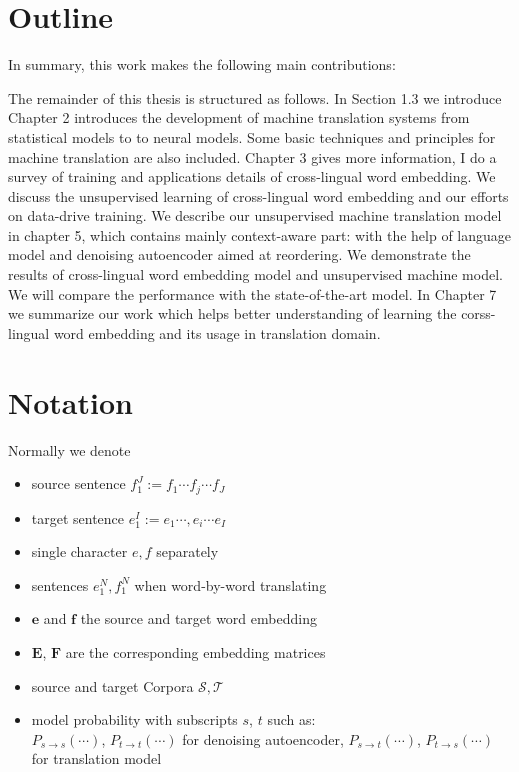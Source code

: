\section{Outline}
In summary, this work makes the following main contributions:

The remainder of this thesis is structured as follows. In Section 1.3 we introduce 
Chapter 2 introduces the development of machine translation systems from statistical models to to neural models. Some basic techniques and principles for machine translation are also included.  Chapter 3 gives more information,  I do a survey of training and applications details of cross-lingual word embedding. We discuss the unsupervised learning of cross-lingual word embedding and our efforts on data-drive training. We describe our unsupervised machine translation model in chapter 5, which contains mainly context-aware part: with the help of language model and denoising autoencoder aimed at reordering. We demonstrate the results of cross-lingual word embedding model and unsupervised machine model. We will compare the performance with the state-of-the-art model. In Chapter 7 we summarize our work which helps better understanding of learning the corss-lingual word embedding and its usage in translation domain.


\section{Notation}
Normally we denote
\begin{itemize}
	\item source sentence  ${f_1^J:= f_1 \cdots  f_j \cdots f_J}$ 
	\item target sentence  ${e_1^I:= e_1 \cdots, e_i \cdots e_I}$
	\item single character $e,f $ separately
	\item sentences $e_1^N, f_1^N$ when word-by-word translating
	\item $\bm{e}$ and $\bm{f}$ the source and target word embedding
	\item $\bm{E}$, $\bm{F}$ are the corresponding embedding matrices
	\item source and target Corpora $\mathcal{S}, \mathcal{T}$
	\item model probability with subscripts $s$, $t$ such as: \\ $P_{s\rightarrow s}(\cdots)$, $P_{t \rightarrow t }(\cdots)$ for denoising autoencoder, $P_{s\rightarrow t}(\cdots)$, $P_{t\rightarrow s}(\cdots)$ for translation model

\end{itemize}










